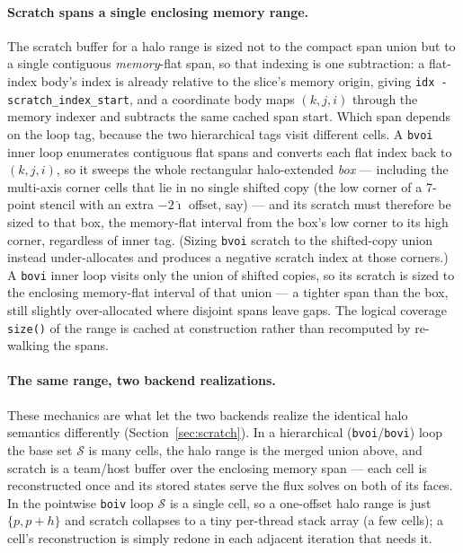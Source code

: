 \documentclass[11pt]{article}
\newcommand{\code}[1]{\lstinline[basicstyle=\ttfamily]|#1|}
\newcommand{\Sset}{\mathcal{S}}
\begin{document}
\paragraph{Scratch spans a single enclosing memory range.} The scratch buffer for a
halo range is sized not to the compact span union but to a single contiguous
\emph{memory}-flat span, so that indexing is one subtraction: a flat-index body's
index is already relative to the slice's memory origin, giving
\code{idx - scratch_index_start}, and a coordinate body maps $(k,j,i)$ through the
memory indexer and subtracts the same cached span start. Which span depends on the
loop tag, because the two hierarchical tags visit different cells. A \code{bvoi}
inner loop enumerates contiguous flat spans and converts each flat index back to
$(k,j,i)$, so it sweeps the whole rectangular halo-extended \emph{box} --- including
the multi-axis corner cells that lie in no single shifted copy (the low corner of a
7-point stencil with an extra $-2\hat{\imath}$ offset, say) --- and its scratch must therefore be
sized to that box, the memory-flat interval from the box's low corner to its high
corner, regardless of inner tag. (Sizing \code{bvoi} scratch to the shifted-copy
union instead under-allocates and produces a negative scratch index at those
corners.) A \code{bovi} inner loop visits only the union of shifted copies, so its
scratch is sized to the enclosing memory-flat interval of that union --- a tighter
span than the box, still slightly over-allocated where disjoint spans leave gaps.
The logical coverage \code{size()} of the range is cached at construction rather
than recomputed by re-walking the spans.

\paragraph{The same range, two backend realizations.} These mechanics are what let
the two backends realize the identical halo semantics differently
(Section~\ref{sec:scratch}). In a hierarchical (\code{bvoi}/\code{bovi}) loop the
base set $\Sset$ is many cells, the halo range is the merged union above, and
scratch is a team/host buffer over the enclosing memory span --- each cell is
reconstructed once and its stored states serve the flux solves on both of its
faces. In the pointwise \code{boiv} loop $\Sset$ is a single cell, so a one-offset
halo range is just $\{p, p+h\}$ and scratch collapses to a tiny per-thread stack
array (a few cells); a cell's reconstruction is simply redone in each adjacent
iteration that needs it.
\end{document}
